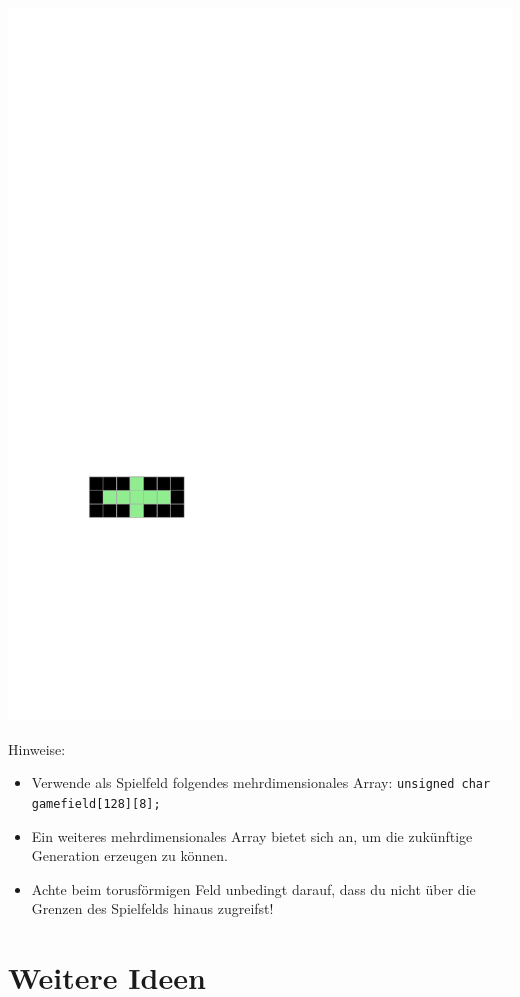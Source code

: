 \begin{center}
\includegraphics[scale=1]{gol_init3}
\end{center}
Hinweise:
\begin{itemize}
\item Verwende als Spielfeld folgendes mehrdimensionales Array:
\texttt{unsigned char gamefield[128][8];}
\item Ein weiteres mehrdimensionales Array bietet sich an, um die zukünftige Generation erzeugen zu können.
\item Achte beim torusförmigen Feld unbedingt darauf, dass du nicht über die Grenzen des Spielfelds hinaus zugreifst!
\end{itemize}

\section{Weitere Ideen}

